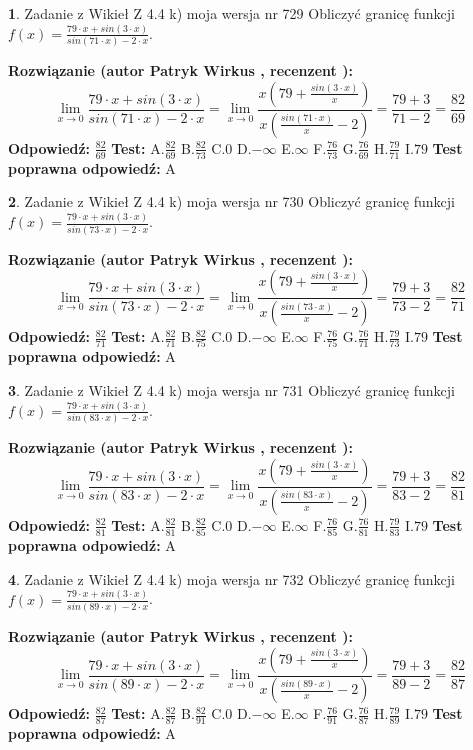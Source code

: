 \documentclass[12pt, a4paper]{article}
\theoremstyle{definition} %
\newtheorem{zad}{}
\newcommand{\zadStart}[1]{\begin{zad}#1\newline}
\newcommand{\zadStop}{\end{zad}}
\newcommand{\rozwStart}[2]{\noindent \textbf{Rozwiązanie (autor #1 , recenzent #2): }\newline}
\newcommand{\rozwStop}{\newline}
\newcommand{\odpStart}{\noindent \textbf{Odpowiedź:}\newline}
\newcommand{\odpStop}{\newline}
\newcommand{\testStart}{\noindent \textbf{Test:}\newline}
\newcommand{\testStop}{\newline}
\newcommand{\kluczStart}{\noindent \textbf{Test poprawna odpowiedź:}\newline}
\newcommand{\kluczStop}{\newline}
\begin{document}
\zadStart{Zadanie z Wikieł Z 4.4 k) moja wersja nr 729}
Obliczyć granicę funkcji $f(x)=\frac{79\cdot x +sin(3\cdot x)}{sin(71\cdot x) -2\cdot x}$.
\zadStop
\rozwStart{Patryk Wirkus}{}
$$\lim\limits_{x\to 0}\frac{79\cdot x +sin(3\cdot x)}{sin(71\cdot x) -2\cdot x}
=\lim\limits_{x\to 0}\frac{x(79+\frac{sin(3\cdot x)}{x})}{x(\frac{sin(71\cdot x)}{x}-2)}
=\frac{79+3}{71-2} = \frac{82}{69}$$
\rozwStop
\odpStart
$\frac{82}{69}$
\odpStop
\testStart
A.$\frac{82}{69}$
B.$\frac{82}{73}$
C.$0$
D.$-\infty$
E.$\infty$
F.$\frac{76}{73}$
G.$\frac{76}{69}$
H.$\frac{79}{71}$
I.$79$
\testStop
\kluczStart
A
\kluczStop



\zadStart{Zadanie z Wikieł Z 4.4 k) moja wersja nr 730}
Obliczyć granicę funkcji $f(x)=\frac{79\cdot x +sin(3\cdot x)}{sin(73\cdot x) -2\cdot x}$.
\zadStop
\rozwStart{Patryk Wirkus}{}
$$\lim\limits_{x\to 0}\frac{79\cdot x +sin(3\cdot x)}{sin(73\cdot x) -2\cdot x}
=\lim\limits_{x\to 0}\frac{x(79+\frac{sin(3\cdot x)}{x})}{x(\frac{sin(73\cdot x)}{x}-2)}
=\frac{79+3}{73-2} = \frac{82}{71}$$
\rozwStop
\odpStart
$\frac{82}{71}$
\odpStop
\testStart
A.$\frac{82}{71}$
B.$\frac{82}{75}$
C.$0$
D.$-\infty$
E.$\infty$
F.$\frac{76}{75}$
G.$\frac{76}{71}$
H.$\frac{79}{73}$
I.$79$
\testStop
\kluczStart
A
\kluczStop



\zadStart{Zadanie z Wikieł Z 4.4 k) moja wersja nr 731}
Obliczyć granicę funkcji $f(x)=\frac{79\cdot x +sin(3\cdot x)}{sin(83\cdot x) -2\cdot x}$.
\zadStop
\rozwStart{Patryk Wirkus}{}
$$\lim\limits_{x\to 0}\frac{79\cdot x +sin(3\cdot x)}{sin(83\cdot x) -2\cdot x}
=\lim\limits_{x\to 0}\frac{x(79+\frac{sin(3\cdot x)}{x})}{x(\frac{sin(83\cdot x)}{x}-2)}
=\frac{79+3}{83-2} = \frac{82}{81}$$
\rozwStop
\odpStart
$\frac{82}{81}$
\odpStop
\testStart
A.$\frac{82}{81}$
B.$\frac{82}{85}$
C.$0$
D.$-\infty$
E.$\infty$
F.$\frac{76}{85}$
G.$\frac{76}{81}$
H.$\frac{79}{83}$
I.$79$
\testStop
\kluczStart
A
\kluczStop



\zadStart{Zadanie z Wikieł Z 4.4 k) moja wersja nr 732}
Obliczyć granicę funkcji $f(x)=\frac{79\cdot x +sin(3\cdot x)}{sin(89\cdot x) -2\cdot x}$.
\zadStop
\rozwStart{Patryk Wirkus}{}
$$\lim\limits_{x\to 0}\frac{79\cdot x +sin(3\cdot x)}{sin(89\cdot x) -2\cdot x}
=\lim\limits_{x\to 0}\frac{x(79+\frac{sin(3\cdot x)}{x})}{x(\frac{sin(89\cdot x)}{x}-2)}
=\frac{79+3}{89-2} = \frac{82}{87}$$
\rozwStop
\odpStart
$\frac{82}{87}$
\odpStop
\testStart
A.$\frac{82}{87}$
B.$\frac{82}{91}$
C.$0$
D.$-\infty$
E.$\infty$
F.$\frac{76}{91}$
G.$\frac{76}{87}$
H.$\frac{79}{89}$
I.$79$
\testStop
\kluczStart
A
\kluczStop
\end{document}

